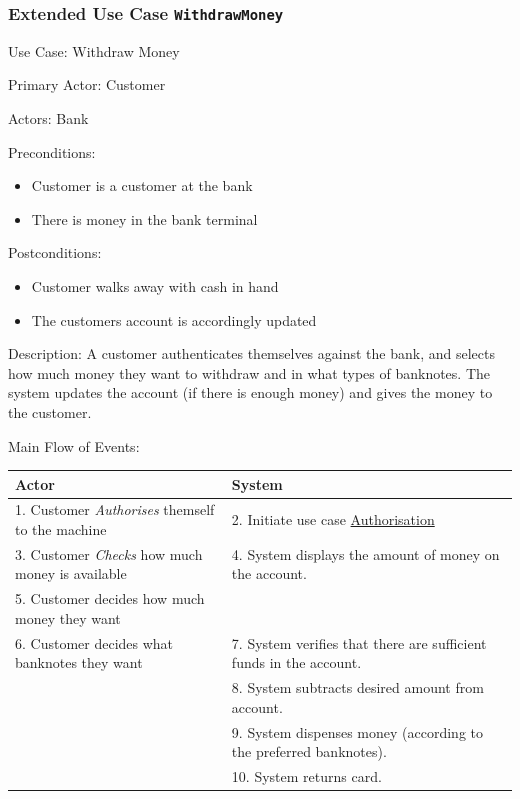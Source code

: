 \documentclass[11pt]{article}
\begin{document}
\subsubsection{Extended Use Case \texttt{WithdrawMoney}}
\label{sec:orgheadline11}
Use Case: Withdraw Money

Primary Actor: Customer

Actors: Bank

Preconditions:
\begin{itemize}
\item Customer is a customer at the bank
\item There is money in the bank terminal
\end{itemize}

Postconditions:
\begin{itemize}
\item Customer walks away with cash in hand
\item The customers account is accordingly updated
\end{itemize}

Description: A customer authenticates themselves against the bank, and selects how much money they want to withdraw and in what types of banknotes. The system updates the account (if there is enough money) and gives the money to the customer.

\begin{scriptsize}
Main Flow of Events:
\begin{center}
\begin{tabular}{ll}
Actor & System\\
\hline
1. Customer \emph{Authorises} themself to the machine & 2. Initiate use case \uline{Authorisation}\\
3. Customer \emph{Checks} how much money is available & 4. System displays the amount of money on the account.\\
5. Customer decides how much money they want & \\
6. Customer decides what banknotes they want & 7. System verifies that there are sufficient funds in the account.\\
 & 8. System subtracts desired amount from account.\\
 & 9. System dispenses money (according to the preferred banknotes).\\
 & 10. System returns card.\\
\hline
\end{tabular}
\end{center}
\end{scriptsize}
\end{document}
